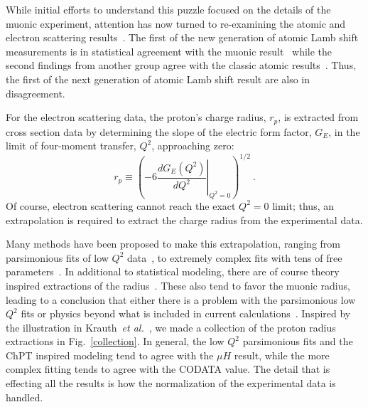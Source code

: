 \documentclass[10pt,aps,prc,twocolumn]{revtex4-1}
\begin{document}
While initial efforts to understand this puzzle focused on the details of the muonic experiment, attention has
now turned to re-examining the atomic and electron scattering results~\cite{Kelkar:2016tcx}.   The first of the
new generation of atomic Lamb shift measurements is in statistical agreement with the muonic 
result~\cite{Beyer79} while the second findings from another group agree with the classic atomic 
results~\cite{fleurbaey:tel-01633631,Fleurbaey:2018}.   Thus, the first of the next generation of
atomic Lamb shift result are also in disagreement.

For the electron scattering data, the proton's charge radius, $r_p$, is extracted from
cross section data by determining the slope of the electric form factor, $G_E$, in the
limit of four-moment transfer, $Q^2$, approaching zero: 
\begin{equation}
\label{eq:radius}
  r_p \equiv %
    \left( -6  \left. \frac{dG_E(Q^2)}{dQ^2}
    \right|_{Q^{2}=0} \right)^{1/2} \>.
\end{equation}
Of course, electron scattering cannot reach the exact $Q^2 = 0$ limit; thus,
an extrapolation is required to extract the charge radius from the experimental data.

Many methods have been proposed to make this extrapolation,
ranging from parsimonious fits of low $Q^2$ data~\cite{Rosenfelder:1999cd,Griffioen:2015hta,Horbatsch:2015qda,Higinbotham:2015rja},
to extremely complex fits with tens of free parameters~\cite{Bernauer:2010wm,Bernauer:2013tpr,Lee:2015jqa,Graczyk:2014lba,Lorenz:2014vha}.
In additional to statistical modeling, there are of course 
theory inspired extractions of the radius~\cite{Belushkin:2006qa,Horbatsch:2016ilr}.   These also tend to favor the 
muonic radius, leading to a conclusion that either there is a problem with the parsimonious low $Q^2$ fits or physics beyond
what is included in current calculations~\cite{Carlson:2015jba,Liu:2016qwd}.
Inspired by the illustration in Krauth~{\it{et al.}}~\cite{Krauth:2017ijq}, we made a collection
of the proton radius extractions in Fig.~\ref{collection}.    In general, the low $Q^2$ parsimonious fits
and the ChPT inspired modeling tend to agree with the $\mu H$ result, while the more complex fitting
tends to agree with the CODATA value.   The detail that is effecting all the results is how the normalization
of the experimental data is handled.
\end{document}
